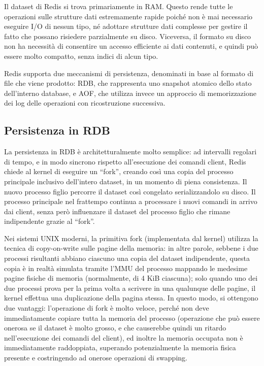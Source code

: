Il dataset di Redis si trova primariamente in RAM. Questo rende tutte le operazioni sulle strutture
dati estremamente rapide poiché non è mai necessario eseguire I/O di nessun tipo, né adottare
strutture dati complesse per gestire il fatto che possano risiedere parzialmente su disco.
Viceversa, il formato su disco non ha necessità di consentire un accesso efficiente ai dati
contenuti, e quindi può essere molto compatto, senza indici di alcun tipo.

Redis supporta due meccanismi di persistenza, denominati in base al formato di file che viene
prodotto: RDB, che rappresenta uno snapshot atomico dello stato dell'interno database, e AOF, che
utilizza invece un approccio di memorizzazione dei log delle operazioni con ricostruzione
successiva.

\subsection{Persistenza in RDB}

La persistenza in RDB è architetturalmente molto semplice: ad intervalli regolari di tempo, e in
modo sincrono rispetto all'esecuzione dei comandi client, Redis chiede al kernel di eseguire un
``fork'', creando così una copia del processo principale inclusivo dell'intero dataset, in un
momento di piena consistenza. Il nuovo processo figlio percorre il dataset così congelato
serializzandolo su disco. Il processo principale nel frattempo continua a processare i nuovi comandi
in arrivo dai client, senza però influenzare il dataset del processo figlio che rimane indipendente
grazie al ``fork''.

Nei sistemi UNIX moderni, la primitiva fork (implementata dal kernel) utilizza la tecnica di
copy-on-write sulle pagine della memoria: in altre parole, sebbene i due processi risultanti abbiano
ciascuno una copia del dataset indipendente, questa copia è in realtà simulata tramite l'MMU del
processo mappando le medesime pagine fisiche di memoria (normalmente, di 4 KiB ciascuna); solo
quando uno dei due processi prova per la prima volta a scrivere in una qualunque delle pagine, il
kernel effettua una duplicazione della pagina stessa. In questo modo, si ottengono due vantaggi:
l'operazione di fork è molto veloce, perché non deve immediatamente copiare tutta la memoria del
processo (operazione che può essere onerosa se il dataset è molto grosso, e che causerebbe quindi un
ritardo nell'esecuzione dei comandi del client), ed inoltre la memoria occupata non è immediatamente
raddoppiata, superando potenzialmente la memoria fisica presente e costringendo ad onerose
operazioni di swapping.

